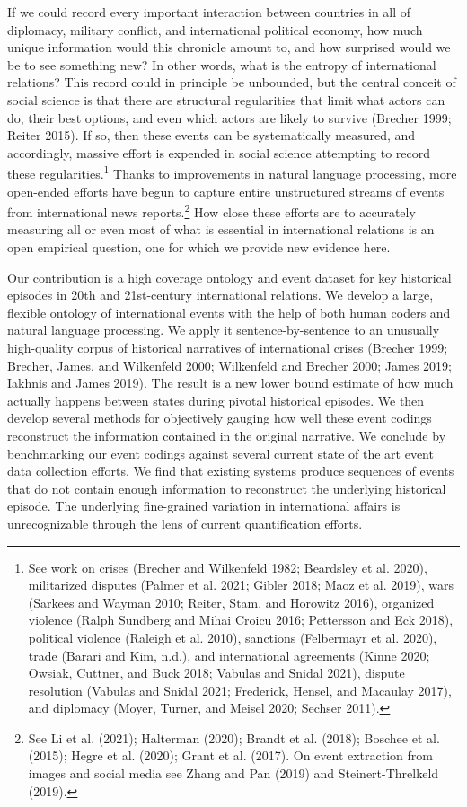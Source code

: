 \documentclass{article}
\begin{document}
If we could record every important interaction between countries in all
of diplomacy, military conflict, and international political economy,
how much unique information would this chronicle amount to, and how
surprised would we be to see something new? In other words, what is the
entropy of international relations? This record could in principle be
unbounded, but the central conceit of social science is that there are
structural regularities that limit what actors can do, their best
options, and even which actors are likely to survive (Brecher 1999;
Reiter 2015). If so, then these events can be systematically measured,
and accordingly, massive effort is expended in social science attempting
to record these regularities.\footnote{See work on crises (Brecher and
  Wilkenfeld 1982; Beardsley et al. 2020), militarized disputes (Palmer
  et al. 2021; Gibler 2018; Maoz et al. 2019), wars (Sarkees and Wayman
  2010; Reiter, Stam, and Horowitz 2016), organized violence (Ralph
  Sundberg and Mihai Croicu 2016; Pettersson and Eck 2018), political
  violence (Raleigh et al. 2010), sanctions (Felbermayr et al. 2020),
  trade (Barari and Kim, n.d.), and international agreements (Kinne
  2020; Owsiak, Cuttner, and Buck 2018; Vabulas and Snidal 2021),
  dispute resolution (Vabulas and Snidal 2021; Frederick, Hensel, and
  Macaulay 2017), and diplomacy (Moyer, Turner, and Meisel 2020; Sechser
  2011).} Thanks to improvements in natural language processing, more
open-ended efforts have begun to capture entire unstructured streams of
events from international news reports.\footnote{See Li et al. (2021);
  Halterman (2020); Brandt et al. (2018); Boschee et al. (2015); Hegre
  et al. (2020); Grant et al. (2017). On event extraction from images
  and social media see Zhang and Pan (2019) and Steinert-Threlkeld
  (2019).} How close these efforts are to accurately measuring all or
even most of what is essential in international relations is an open
empirical question, one for which we provide new evidence here.

Our contribution is a high coverage ontology and event dataset for key
historical episodes in 20th and 21st-century international relations. We
develop a large, flexible ontology of international events with the help
of both human coders and natural language processing. We apply it
sentence-by-sentence to an unusually high-quality corpus of historical
narratives of international crises (Brecher 1999; Brecher, James, and
Wilkenfeld 2000; Wilkenfeld and Brecher 2000; James 2019; Iakhnis and
James 2019). The result is a new lower bound estimate of how much
actually happens between states during pivotal historical episodes. We
then develop several methods for objectively gauging how well these
event codings reconstruct the information contained in the original
narrative. We conclude by benchmarking our event codings against several
current state of the art event data collection efforts. We find that
existing systems produce sequences of events that do not contain enough
information to reconstruct the underlying historical episode. The
underlying fine-grained variation in international affairs is
unrecognizable through the lens of current quantification efforts.
\end{document}
